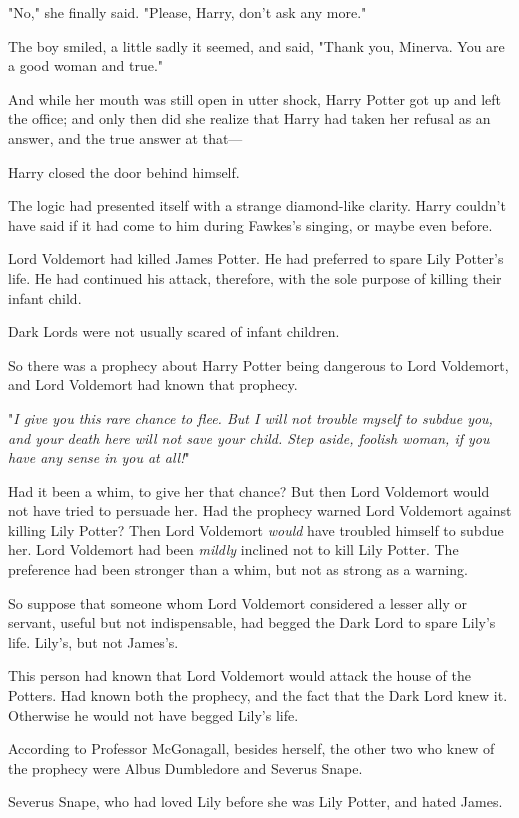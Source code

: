 "No," she finally said. "Please, Harry, don't ask any more."

The boy smiled, a little sadly it seemed, and said, "Thank you, Minerva. You
are a good woman and true."

And while her mouth was still open in utter shock, Harry Potter got up and left
the office; and only then did she realize that Harry had taken her refusal as
an answer, and the true answer at that---

Harry closed the door behind himself.

The logic had presented itself with a strange diamond-like clarity. Harry
couldn't have said if it had come to him during Fawkes's singing, or maybe even
before.

Lord Voldemort had killed James Potter. He had preferred to spare Lily Potter's
life. He had continued his attack, therefore, with the sole purpose of killing
their infant child.

Dark Lords were not usually scared of infant children.

So there was a prophecy about Harry Potter being dangerous to Lord Voldemort,
and Lord Voldemort had known that prophecy.

"\emph{I give you this rare chance to flee. But I will not trouble myself to
subdue you, and your death here will not save your child. Step aside, foolish
woman, if you have any sense in you at all!}"

Had it been a whim, to give her that chance? But then Lord Voldemort would not
have tried to persuade her. Had the prophecy warned Lord Voldemort against
killing Lily Potter? Then Lord Voldemort \emph{would} have troubled himself to
subdue her. Lord Voldemort had been \emph{mildly} inclined not to kill Lily
Potter. The preference had been stronger than a whim, but not as strong as a
warning.

So suppose that someone whom Lord Voldemort considered a lesser ally or
servant, useful but not indispensable, had begged the Dark Lord to spare Lily's
life. Lily's, but not James's.

This person had known that Lord Voldemort would attack the house of the
Potters. Had known both the prophecy, and the fact that the Dark Lord knew it.
Otherwise he would not have begged Lily's life.

According to Professor McGonagall, besides herself, the other two who knew of
the prophecy were Albus Dumbledore and Severus Snape.

Severus Snape, who had loved Lily before she was Lily Potter, and hated James.

